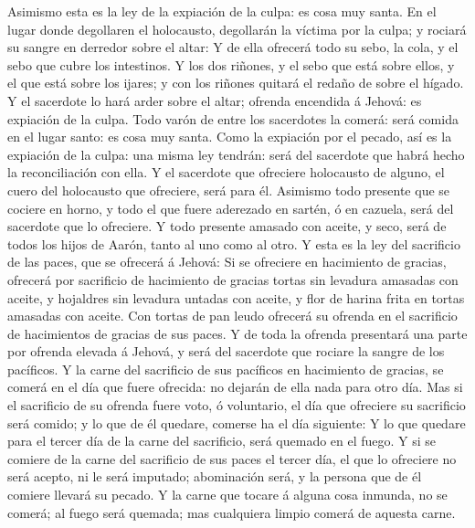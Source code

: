  Asimismo esta es la ley de la expiación de la culpa: es
cosa muy santa.  En el lugar donde degollaren el holocausto,
degollarán la víctima por la culpa; y rociará su sangre en derredor
sobre el altar:  Y de ella ofrecerá todo su sebo, la cola, y
el sebo que cubre los intestinos.  Y los dos riñones, y el
sebo que está sobre ellos, y el que está sobre los ijares; y con los
riñones quitará el redaño de sobre el hígado.  Y el
sacerdote lo hará arder sobre el altar; ofrenda encendida á Jehová: es
expiación de la culpa.  Todo varón de entre los sacerdotes
la comerá: será comida en el lugar santo: es cosa muy santa.
 Como la expiación por el pecado, así es la expiación de la
culpa: una misma ley tendrán: será del sacerdote que habrá hecho la
reconciliación con ella.  Y el sacerdote que ofreciere
holocausto de alguno, el cuero del holocausto que ofreciere, será para
él.  Asimismo todo presente que se cociere en horno, y todo
el que fuere aderezado en sartén, ó en cazuela, será del sacerdote que
lo ofreciere.  Y todo presente amasado con aceite, y seco,
será de todos los hijos de Aarón, tanto al uno como al otro.
 Y esta es la ley del sacrificio de las paces, que se
ofrecerá á Jehová:  Si se ofreciere en hacimiento de
gracias, ofrecerá por sacrificio de hacimiento de gracias tortas sin
levadura amasadas con aceite, y hojaldres sin levadura untadas con
aceite, y flor de harina frita en tortas amasadas con aceite.
 Con tortas de pan leudo ofrecerá su ofrenda en el
sacrificio de hacimientos de gracias de sus paces.  Y de
toda la ofrenda presentará una parte por ofrenda elevada á Jehová, y
será del sacerdote que rociare la sangre de los pacíficos. 
Y la carne del sacrificio de sus pacíficos en hacimiento de gracias, se
comerá en el día que fuere ofrecida: no dejarán de ella nada para otro
día.  Mas si el sacrificio de su ofrenda fuere voto, ó
voluntario, el día que ofreciere su sacrificio será comido; y lo que de
él quedare, comerse ha el día siguiente:  Y lo que quedare
para el tercer día de la carne del sacrificio, será quemado en el fuego.
 Y si se comiere de la carne del sacrificio de sus paces el
tercer día, el que lo ofreciere no será acepto, ni le será imputado;
abominación será, y la persona que de él comiere llevará su pecado.
 Y la carne que tocare á alguna cosa inmunda, no se comerá;
al fuego será quemada; mas cualquiera limpio comerá de aquesta carne.
